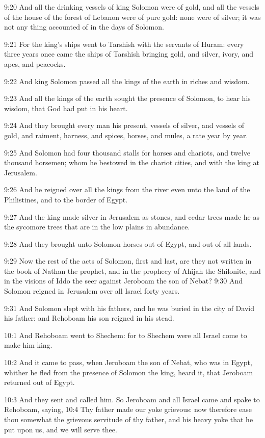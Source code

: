 9:20 And all the drinking vessels of king Solomon were of gold, and
all the vessels of the house of the forest of Lebanon were of pure
gold: none were of silver; it was not any thing accounted of in the
days of Solomon.

9:21 For the king's ships went to Tarshish with the servants of Huram:
every three years once came the ships of Tarshish bringing gold, and
silver, ivory, and apes, and peacocks.

9:22 And king Solomon passed all the kings of the earth in riches and
wisdom.

9:23 And all the kings of the earth sought the presence of Solomon, to
hear his wisdom, that God had put in his heart.

9:24 And they brought every man his present, vessels of silver, and
vessels of gold, and raiment, harness, and spices, horses, and mules,
a rate year by year.

9:25 And Solomon had four thousand stalls for horses and chariots, and
twelve thousand horsemen; whom he bestowed in the chariot cities, and
with the king at Jerusalem.

9:26 And he reigned over all the kings from the river even unto the
land of the Philistines, and to the border of Egypt.

9:27 And the king made silver in Jerusalem as stones, and cedar trees
made he as the sycomore trees that are in the low plains in abundance.

9:28 And they brought unto Solomon horses out of Egypt, and out of all
lands.

9:29 Now the rest of the acts of Solomon, first and last, are they not
written in the book of Nathan the prophet, and in the prophecy of
Ahijah the Shilonite, and in the visions of Iddo the seer against
Jeroboam the son of Nebat?  9:30 And Solomon reigned in Jerusalem over
all Israel forty years.

9:31 And Solomon slept with his fathers, and he was buried in the city
of David his father: and Rehoboam his son reigned in his stead.

10:1 And Rehoboam went to Shechem: for to Shechem were all Israel come
to make him king.

10:2 And it came to pass, when Jeroboam the son of Nebat, who was in
Egypt, whither he fled from the presence of Solomon the king, heard
it, that Jeroboam returned out of Egypt.

10:3 And they sent and called him. So Jeroboam and all Israel came and
spake to Rehoboam, saying, 10:4 Thy father made our yoke grievous: now
therefore ease thou somewhat the grievous servitude of thy father, and
his heavy yoke that he put upon us, and we will serve thee.

